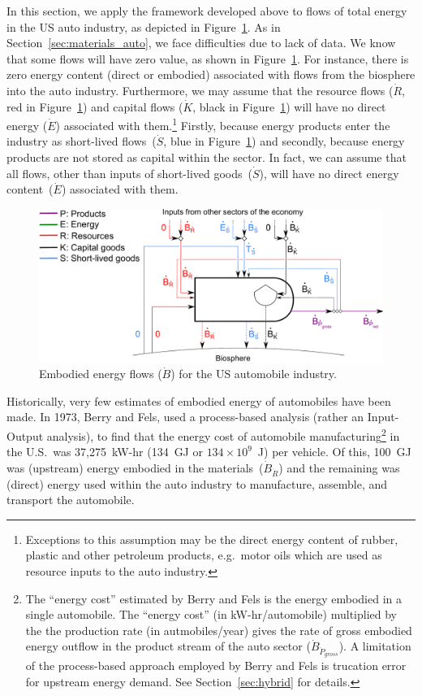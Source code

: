 In this section,
we apply the framework developed above to flows of
total energy in the US auto industry,
as depicted in Figure~\ref{fig:PERKS_embodied_auto}.
As in Section~\ref{sec:materials_auto},
we face difficulties due to lack of data.
We know that some flows will have zero value,
as shown in Figure~\ref{fig:PERKS_embodied_auto}.
For instance, there is zero energy content
(direct or embodied) associated with
flows from the biosphere into the auto industry.
Furthermore,
we may assume that the
resource flows ($\dot{R}$, red in Figure~\ref{fig:PERKS_embodied_auto})
and capital flows ($\dot{K}$, black in Figure~\ref{fig:PERKS_embodied_auto}) 
will have no direct energy ($\dot{E}$)
associated with them.\footnote{Exceptions
	to this assumption may be the direct energy content
	of rubber, plastic and other petroleum products,
	e.g.\ motor oils which are used as resource
	inputs to the auto industry.}
Firstly,
because energy products enter the industry 
as short-lived flows~($\dot{S}$, blue in Figure~\ref{fig:PERKS_embodied_auto}) 
and secondly,
because energy products are not stored
as capital within the sector.
In fact,
we can assume that all flows,
other than inputs of short-lived
goods~($\dot{S}$),
will have no direct energy content~($\dot{E}$) 
associated with them.

\begin{figure}[!ht]
\centering
\includegraphics[width=0.8\linewidth]{Part_1/Chapter_Embodied/images/PERKS_basic_unit_embodied_energy_content_auto_ind.pdf}
\caption[Embodied energy flows for the US automobile industry]{Embodied energy flows ($\dot{B}$) for the US automobile industry.}
\label{fig:PERKS_embodied_auto}
\end{figure}

Historically, very few estimates of embodied energy of automobiles have been made.
In 1973, Berry and Fels, used a process-based analysis 
(rather an Input-Output analysis),
to find that the energy cost of automobile 
manufacturing\footnote{The ``energy cost'' estimated 
	by Berry and Fels is the 
	energy embodied in a single automobile. 
	The ``energy cost'' (in kW-hr/automobile) multiplied by the 
	the production rate (in autmobiles/year) gives the rate of gross embodied
	energy outflow in the product stream of the auto sector ($\dot{B}_{\dot{P}_{gross}}$).
	A limitation of the process-based approach employed by Berry and Fels
	is trucation error for upstream energy demand. 
	See Section~\ref{sec:hybrid} for details.}
in the U.S.\ was 37,275~kW-hr (134~GJ or $134 \times 10^9$~J) 
per vehicle.\cite[Table~2]{Berry:1973vo} 
Of this,
100~GJ was (upstream) energy embodied in the materials~($\dot{B}_{\dot{R}}$)
and the remaining was (direct) energy used within the auto
industry to manufacture,
assemble, and transport the automobile. 

